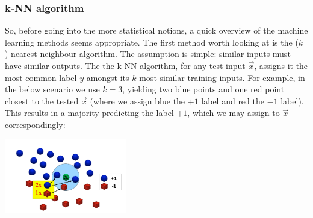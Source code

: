 \documentclass{article}
\begin{document}
\subsubsection{k-NN algorithm}
So, before going into the more statistical notions, a quick overview of the machine learning methods seems appropriate. The first method worth looking at is the ($k$)-nearest neighbour algorithm. The assumption is simple: similar inputs must have similar outputs. The the k-NN algorithm, for any test input $\vec{x}$, assigns it the most common label $y$ amongst its $k$ most similar training inputs. For example, in the below scenario we use $k=3$, yielding two blue points and one red point closest to the tested $\vec{x}$ (where we assign blue the $+1$ label and red the $-1$ label). This results in a majority predicting the label $+1$, which we may assign to $\vec{x}$ correspondingly:
\begin{center}\includegraphics[width=0.4\textwidth]{knnfig.png}\end{center}
\end{document}
